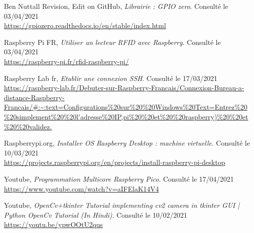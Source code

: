 \documentclass[a4paper]{report}
\begin{document}
    
    \clearpage
    \begin{thebibliography}{9}

        \bibitem{}
            Ben Nuttall Revision, Edit on GitHub,
            \emph{Librairie : GPIO zero}. \newline
            Consulté le 03/04/2021\\
            \url{https://gpiozero.readthedocs.io/en/stable/index.html}

        \bibitem{}
            Raspberry Pi FR,
            \emph{Utiliser un lecteur RFID avec Raspberry}. \newline
            Consulté le 03/04/2021\\
            \url{https://raspberry-pi.fr/rfid-raspberry-pi/}
            
        \bibitem{}\label{bib:Connexion SSH}
            Raspberry Lab fr,
            \emph{Etablir une connexion SSH}. \newline
            Consulté le 17/03/2021\\
            \url{https://raspberry-lab.fr/Debuter-sur-Raspberry-Francais/Connexion-Bureau-a-distance-Raspberry-Francais/#:~:text=Configurations%20sur%20%20Windows%20Text=Entrez%20%20simplement%20%20l'adresse%20IP,pi%20%20et%20%20raspberry)%20%20et%20%20validez.}
            
        \bibitem{}\label{bib:raspebrry_os}
            Raspberrypi.org,
            \emph{Installer OS Raspberry Desktop : machine virtuelle}. \newline
            Consulté le 10/03/2021\\
            \url{https://projects.raspberrypi.org/en/projects/install-raspberry-pi-desktop}
            
        \bibitem{}\label{bib:multicore_pico}
            Youtube,
            \emph{Programmation Multicore Raspberry Pico}. \newline
            Consulté le 17/04/2021\\
            \url{https://www.youtube.com/watch?v=aIFElaK14V4}

        \bibitem{}\label{bib:multicore_pico}
            Youtube,
            \emph{OpenCv+tkinter Tutorial implementing cv2 camera in tkinter GUI | Python OpenCv Tutorial (In Hindi)}. \newline
            Consulté le 10/02/2021\\
            \url{https://youtu.be/ypwOOtU2qus}


\end{thebibliography}
\end{document}

